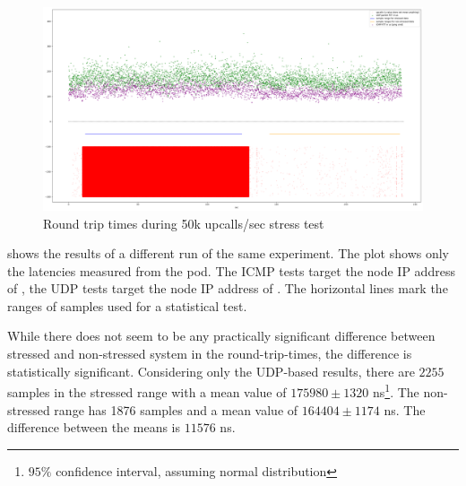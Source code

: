 \begin{figure}
    \centering
    \includegraphics[width=.9\linewidth]{img/packet_flood_50k_latency.png}
    \caption{Round trip times during 50k upcalls/sec stress test}
    \label{fig:plot-packet-flood-50k-latency}
\end{figure}

 shows the results of a different run of the same experiment. The plot shows only the latencies measured from the  pod. The ICMP tests target the node IP address of , the UDP tests target the node IP address of . The horizontal lines mark the ranges of samples used for a statistical test.

While there does not seem to be any practically significant difference between stressed and non-stressed system in the round-trip-times, the difference is statistically significant. Considering only the UDP-based results, there are $2255$ samples in the stressed range with a mean value of $175980 \pm 1320$ \si{\nano\second}\footnote{$95\%$ confidence interval, assuming normal distribution}. The non-stressed range has 1876 samples and a mean value of $164404 \pm 1174$ \si{\nano\second}. The difference between the means is $11576$ \si{\nano\second}.

